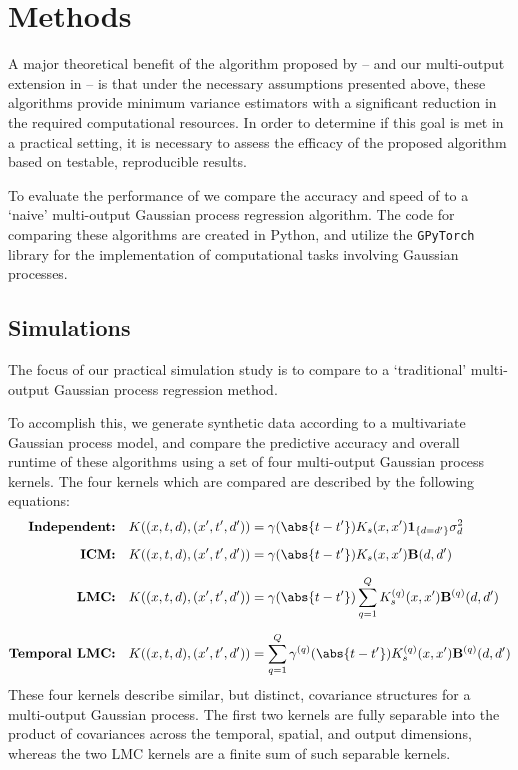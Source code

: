 \documentclass[10pt]{article}
\begin{document}
\section{Methods}
\label{sec:methods}

A major theoretical benefit of the algorithm proposed by \citeauthor{Todescato-Efficient-2020} -- and our multi-output extension in  -- is that under the necessary assumptions presented above, these algorithms provide minimum variance estimators with a significant reduction in the required computational resources. In order to determine if this goal is met in a practical setting, it is necessary to assess the efficacy of the proposed algorithm based on testable, reproducible results.

To evaluate the performance of  we compare the accuracy and speed of  to a `naive' multi-output Gaussian process regression algorithm. The code for comparing these algorithms are created in Python, and utilize the \texttt{GPyTorch} library \citep{GPyTorch-Library-2018} for the implementation of computational tasks involving Gaussian processes.

\subsection{Simulations}
The focus of our practical simulation study is to compare  to a `traditional' multi-output Gaussian process regression method. 

To accomplish this, we generate synthetic data according to a multivariate Gaussian process model, and compare the predictive accuracy and overall runtime of these algorithms using a set of four multi-output Gaussian process kernels. The four kernels which are compared are described by the following equations:
\begin{subequations}
    \label{eq:simulation-kernels}
    \begin{align}
        \textbf{Independent:} \quad & K((x, t, d), (x', t', d')) = \gamma(\abs{t - t'}) K_{s}(x, x') \mathbf{1}_{\{d = d'\}}\sigma^{2}_{d}\\[6pt]
        \textbf{ICM:} \quad & K((x, t, d), (x', t', d')) = \gamma(\abs{t - t'}) K_{s}(x, x') \bfB(d, d')\\[6pt]
        \textbf{LMC:} \quad & K((x, t, d), (x', t', d')) = \gamma(\abs{t - t'}) \sum_{q=1}^{Q} K_{s}^{(q)}(x, x') \bfB^{(q)}(d, d')\\[6pt]
        \textbf{Temporal LMC:} \quad & K((x, t, d), (x', t', d')) = \sum_{q=1}^{Q} \gamma^{(q)}(\abs{t - t'}) K_{s}^{(q)}(x, x') \bfB^{(q)}(d, d')
    \end{align}
\end{subequations}
These four kernels describe similar, but distinct, covariance structures for a multi-output Gaussian process. The first two kernels are fully separable into the product of covariances across the temporal, spatial, and output dimensions, whereas the two LMC kernels are a finite sum of such separable kernels. 
\end{document}
